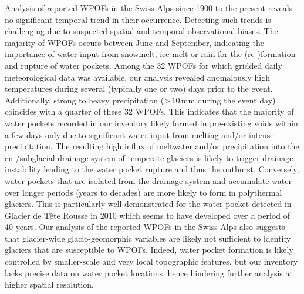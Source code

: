 Analysis of reported WPOFs in the Swiss Alps since 1900 to the present reveals no significant temporal trend in their occurrence. Detecting such trends is challenging due to suspected spatial and temporal observational biases. The majority of WPOFs occurs between June and September, indicating the importance of water input from snowmelt, ice melt or rain for the (re-)formation and rupture of water pockets. Among the 32 WPOFs for which gridded daily meteorological data was available, our analysis revealed anomalously high temperatures during several (typically one or two) days prior to the event. Additionally, strong to heavy precipitation (>\,10\,mm during the event day) coincides with a quarter of these 32 WPOFs. This indicates that the majority of water pockets recorded in our inventory likely formed in pre-existing voids within a few days only due to significant water input from melting and/or intense precipitation. The resulting high influx of meltwater and/or precipitation into the en-/subglacial drainage system of temperate glaciers is likely to trigger drainage instability leading to the water pocket rupture and thus the outburst. Conversely, water pockets that are isolated from the drainage system and accumulate water over longer periods (years to decades) are more likely to form in polythermal glaciers. This is particularly well demonstrated for the water pocket detected in Glacier de Tête Rousse in 2010 which seems to have developed over a period of 40 years. Our analysis of the reported WPOFs in the Swiss Alps also suggests that glacier-wide glacio-geomorphic variables are likely not sufficient to identify glaciers that are susceptible to WPOFs. Indeed, water pocket formation is likely controlled by smaller-scale and very local topographic features, but our inventory lacks precise data on water pocket locations, hence hindering further analysis at higher spatial resolution.

